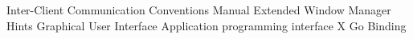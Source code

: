  {Inter-Client Communication Conventions Manual}
 {Extended Window Manager Hints}
 {Graphical User Interface}
 {Application programming interface}
 {X Go Binding}
